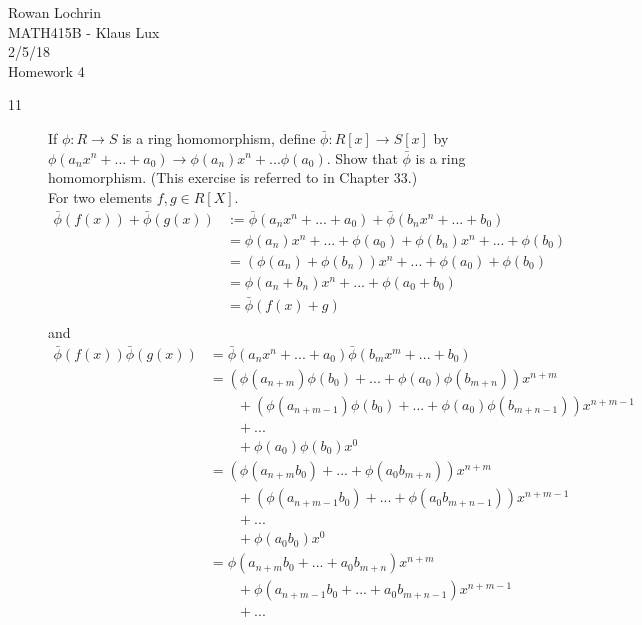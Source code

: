 \documentclass[11pt]{article}
\begin{document}
\begin{flushleft}
	Rowan Lochrin \\
	MATH415B - Klaus Lux \\
	2/5/18 \\
	Homework 4
\end{flushleft}
\begin{description}
	\item[11] If $\phi: R \rightarrow S$ is a ring homomorphism, define
		$\bar\phi: R[x] \rightarrow  S[x]$ by
		$\phi(a_nx^n + ... + a_0) \rightarrow  \phi(a_n) x^n + ...
		\phi(a_0)$. Show that $\bar\phi$ is a ring homomorphism.
		(This exercise is referred to in Chapter 33.)\\
		For two elements $f,g \in R[X]$.
		\begin{align*}
			\bar\phi(f(x)) + \bar\phi(g(x)) 
			& := \bar\phi(a_nx^n + ... + a_0) + \bar\phi(b_nx^n + ... + b_0) \\
			& = \phi(a_n) x^n + ... + \phi(a_0) + \phi(b_n) x^n +... + \phi(b_0) \\
			& = (\phi(a_n) + \phi(b_n))x^n  + ... + \phi(a_0)  + \phi(b_0) \\
			& = \phi(a_n + b_n)x^n  + ... + \phi(a_0 + b_0) \\
			& = \bar\phi(f(x) + g)\\
		\end{align*}
		and
		\begin{align*}
			\bar\phi(f(x))\bar\phi(g(x)) 
			& = \bar\phi(a_nx^n + ... + a_0)\bar\phi(b_{m}x^m + ... + b_0) \\
			& = (\phi(a_{n+m})\phi(b_0) + ... + \phi(a_0)\phi(b_{m+n}))x^{n+m} \\
			& \qquad + (\phi(a_{n+m -1})\phi(b_0) + ...  + \phi(a_0)\phi(b_{m+n - 1}))x^{n+m -1} \\
			& \qquad +  ...  \\
			& \qquad + \phi(a_0)\phi(b_0)x^0 \\
			& = (\phi(a_{n+m}b_0) + ... + \phi(a_0b_{m+n}))x^{n+m} \\
			& \qquad + (\phi(a_{n+m -1}b_0) + ...  + \phi(a_0b_{m+n - 1}))x^{n+m -1} \\
			& \qquad +  ...  \\
			& \qquad + \phi(a_0b_0)x^0 \\
			& = \phi(a_{n + m}b_0 + ... + a_0b_{m + n})x^{n + m} \\
			& \qquad + \phi(a_{n+m-1}b_0 + ...  + a_0b_{m + n - 1})x^{n + m - 1} \\
			& \qquad +  ...  \\

\end{align*}
\end{description}
\end{document}
